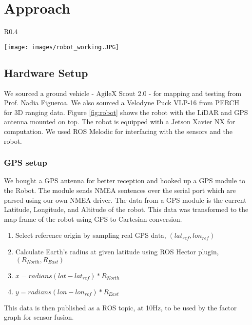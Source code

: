 \documentclass[10pt, reqno, letterpaper, twoside]{amsart}
\begin{document}

\section{Approach}
\begin{wrapfigure}{R}{0.4\textwidth}
  \begin{center}
    \texttt{[image: images/robot\_working.JPG]}
  \end{center}
  \caption{AgileX Scout 2.0 with Velodyne LiDAR and GPS antenna}
    \label{fig:robot}
\end{wrapfigure}

\subsection{Hardware Setup}
We sourced a ground vehicle - AgileX Scout 2.0 - for mapping and testing from Prof. Nadia Figueroa. We also sourced a Velodyne Puck VLP-16 from PERCH for 3D ranging data. Figure \ref{fig:robot} shows the robot with the LiDAR and GPS antenna mounted on top. The robot is equipped with a Jetson Xavier NX for computation. We used ROS Melodic for interfacing with the sensors and the robot.


\subsubsection{\textbf{GPS setup}}
We bought a GPS antenna for better reception and hooked up a GPS module to the Robot. The module sends NMEA sentences over the serial port which are parsed using our own NMEA driver. The data from a GPS module is the current Latitude, Longitude, and Altitude of the robot. This data was transformed to the map frame of the robot using GPS to Cartesian conversion.
\begin{enumerate}
    \item Select reference origin by sampling real GPS data, $(lat_{ref}, lon_{ref})$
    \item Calculate Earth's radius at given latitude using ROS Hector plugin, $(R_{North}, R_{East})$
    \item $x = radians(lat - lat_{ref}) * R_{North}$
    \item $y = radians(lon - lon_{ref}) * R_{East}$
\end{enumerate}
This data is then published as a ROS topic, at 10Hz, to be used by the factor graph for sensor fusion.
\end{document}

